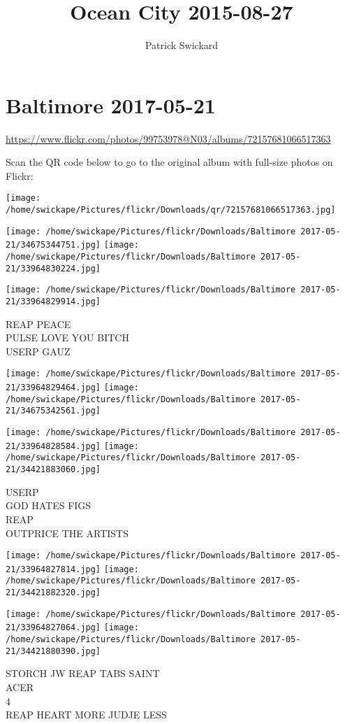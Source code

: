 \documentclass[10pt,letterpaper]{article}
\title{Ocean City 2015-08-27}
\author{Patrick Swickard}
\date{}
\begin{document}
\section*{Baltimore 2017-05-21}

\url{https://www.flickr.com/photos/99753978@N03/albums/72157681066517363}

Scan the QR code below to go to the original album with full-size photos on Flickr:

\texttt{[image: /home/swickape/Pictures/flickr/Downloads/qr/72157681066517363.jpg]}
\pagebreak

\texttt{[image: /home/swickape/Pictures/flickr/Downloads/Baltimore 2017-05-21/34675344751.jpg]}
\texttt{[image: /home/swickape/Pictures/flickr/Downloads/Baltimore 2017-05-21/33964830224.jpg]}

\vspace{0.25in}
\texttt{[image: /home/swickape/Pictures/flickr/Downloads/Baltimore 2017-05-21/33964829914.jpg]}

REAP PEACE\\
PULSE LOVE YOU BITCH\\
USERP GAUZ
\pagebreak

\texttt{[image: /home/swickape/Pictures/flickr/Downloads/Baltimore 2017-05-21/33964829464.jpg]}
\texttt{[image: /home/swickape/Pictures/flickr/Downloads/Baltimore 2017-05-21/34675342561.jpg]}

\texttt{[image: /home/swickape/Pictures/flickr/Downloads/Baltimore 2017-05-21/33964828584.jpg]}
\texttt{[image: /home/swickape/Pictures/flickr/Downloads/Baltimore 2017-05-21/34421883060.jpg]}

USERP\\
GOD HATES FIGS\\
REAP\\
OUTPRICE THE ARTISTS
\pagebreak

\texttt{[image: /home/swickape/Pictures/flickr/Downloads/Baltimore 2017-05-21/33964827814.jpg]}
\texttt{[image: /home/swickape/Pictures/flickr/Downloads/Baltimore 2017-05-21/34421882320.jpg]}

\texttt{[image: /home/swickape/Pictures/flickr/Downloads/Baltimore 2017-05-21/33964827064.jpg]}
\texttt{[image: /home/swickape/Pictures/flickr/Downloads/Baltimore 2017-05-21/34421880390.jpg]}

STORCH JW REAP TABS SAINT\\
ACER\\
4\\
REAP HEART MORE JUDJE LESS
\pagebreak
\end{document}
